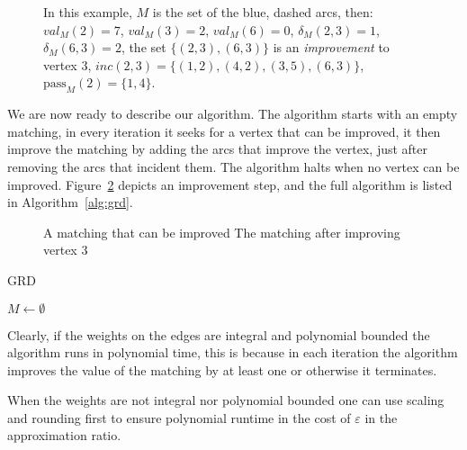 \begin{figure}
\centering

\caption[]{
\label{fig:defs}
In this example, $M$ is the set of the blue, dashed arcs, then:
$val_M(2) = 7$,
$val_M(3) = 2$,
$val_M(6) = 0$,
$\delta_M(2, 3) = 1$,
$\delta_M(6, 3) = 2$,
the set $\{(2,3), (6,3)\}$ is an \emph{improvement} to vertex 3,
$inc(2,3) = \{(1,2),(4,2),(3,5),(6,3)\}$,
$\text{pass}_M(2) = \{1, 4\}$.
}
\end{figure}

We are now ready to describe our algorithm.
The algorithm starts with an empty matching,
in every iteration it seeks for a vertex that can be improved,
it then improve the matching by adding
the arcs that improve the vertex, 
just after removing the arcs that incident them.
The algorithm halts when no vertex can be improved.
Figure~\ref{fig:improvement} depicts an improvement step,
and the full algorithm is listed in Algorithm~\ref{alg:grd}. 

\begin{figure}
\centering

\caption[]{
\label{fig:improvement}
A matching that can be improved
The matching after improving vertex 3
}
\end{figure}

\begin{algorithm}
\caption{
\label{alg:grd}
GRD
}
$M \leftarrow \emptyset$									\\
\end{algorithm}

\begin{remark}
Clearly, if the weights on the edges are integral and polynomial bounded the
algorithm runs in polynomial time, this is because in each iteration the
algorithm improves the value of the matching by at least one or otherwise it
terminates.
\end{remark}

\begin{remark}
When the weights are not integral nor polynomial bounded one can use scaling and
rounding first to ensure polynomial runtime in the cost of $\varepsilon$ in the
approximation ratio.
\end{remark}

